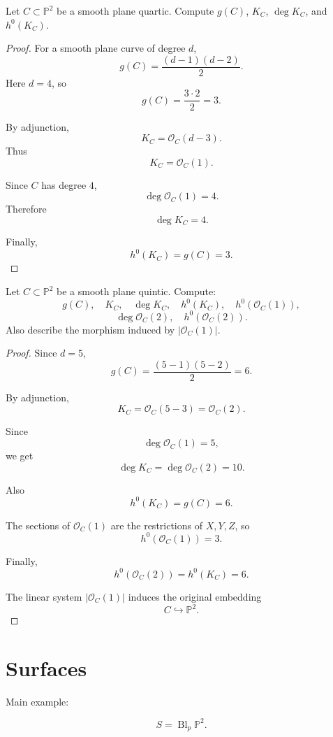 \begin{exercise}
\label{exercise-plane-quartic-genus}
Let $C\subset \mathbb P^2$ be a smooth
plane quartic. Compute $g(C)$,
$K_C$, $\deg K_C$, and $h^0(K_C)$.
\end{exercise}

\begin{proof}
For a smooth plane curve of degree $d$,
$$
  g(C)=\frac{(d-1)(d-2)}2.
$$
Here $d=4$, so
$$
  g(C)=\frac{3\cdot 2}{2}=3.
$$

By adjunction,
$$
  K_C=\mathcal O_C(d-3).
$$
Thus
$$
  K_C=\mathcal O_C(1).
$$

Since $C$ has degree $4$,
$$
  \deg \mathcal O_C(1)=4.
$$
Therefore
$$
  \deg K_C=4.
$$

Finally,
$$
  h^0(K_C)=g(C)=3.
$$
\end{proof}

\begin{exercise}
\label{exercise-plane-quintic}
Let $C\subset \mathbb P^2$ be a smooth
plane quintic. Compute:
$$
  g(C),\quad
  K_C,\quad
  \deg K_C,\quad
  h^0(K_C),
  \quad
  h^0(\mathcal O_C(1)),
$$
$$
  \deg \mathcal O_C(2),
  \quad
  h^0(\mathcal O_C(2)).
$$
Also describe the morphism induced by
$|\mathcal O_C(1)|$.
\end{exercise}

\begin{proof}
Since $d=5$,
$$
  g(C)
  =
  \frac{(5-1)(5-2)}2
  =
  6.
$$

By adjunction,
$$
  K_C=\mathcal O_C(5-3)
  =
  \mathcal O_C(2).
$$

Since
$$
  \deg \mathcal O_C(1)=5,
$$
we get
$$
  \deg K_C
  =
  \deg \mathcal O_C(2)
  =
  10.
$$

Also
$$
  h^0(K_C)=g(C)=6.
$$

The sections of $\mathcal O_C(1)$ are
the restrictions of $X,Y,Z$, so
$$
  h^0(\mathcal O_C(1))=3.
$$

Finally,
$$
  h^0(\mathcal O_C(2))
  =
  h^0(K_C)
  =
  6.
$$

The linear system $|\mathcal O_C(1)|$
induces the original embedding
$$
  C\hookrightarrow \mathbb P^2.
$$
\end{proof}

\section{Surfaces}
\label{section-surfaces}

Main example:

$$
  S=\operatorname{Bl}_p\mathbb P^2.
$$

